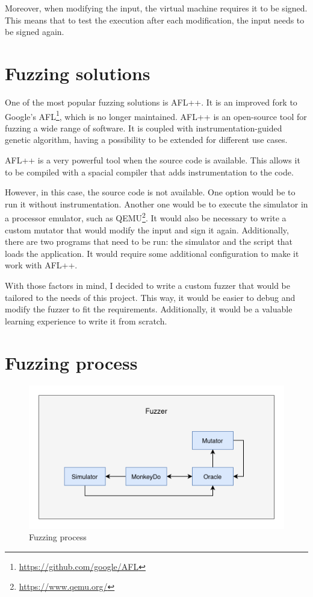 Moreover, when modifying the input, the virtual machine requires it to be signed.
This means that to test the execution after each modification, the input needs to be signed again.


\section{Fuzzing solutions}
One of the most popular fuzzing solutions is AFL++\cite{aflplusplus}.
It is an improved fork to Google's AFL\footnote{\url{https://github.com/google/AFL}}, which is no longer maintained.
AFL++ is an open-source tool for fuzzing a wide range of software.
It is coupled with instrumentation-guided genetic algorithm, having a possibility to be extended for different use cases.

AFL++ is a very powerful tool when the source code is available.
This allows it to be compiled with a spacial compiler that adds instrumentation to the code.

However, in this case, the source code is not available.
One option would be to run it without instrumentation.
Another one would be to execute the simulator in a processor emulator, such as QEMU\footnote{\url{https://www.qemu.org/}}.
It would also be necessary to write a custom mutator that would modify the input and sign it again.
Additionally, there are two programs that need to be run: the simulator and the script that loads the application.
It would require some additional configuration to make it work with AFL++.

With those factors in mind, I decided to write a custom fuzzer that would be tailored to the needs of this project.
This way, it would be easier to debug and modify the fuzzer to fit the requirements.
Additionally, it would be a valuable learning experience to write it from scratch.


\section{Fuzzing process}
\begin{figure}[h]
    \centering
    \includegraphics[width=0.8\linewidth]{../../images/fuzzer-diagram}
    \caption{Fuzzing process}
    \label{fig:fuzzer-diagram}
\end{figure}


